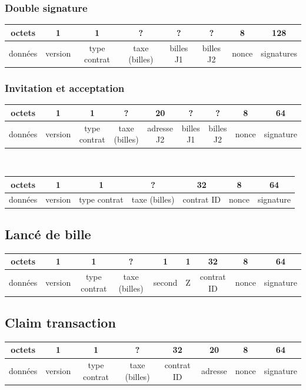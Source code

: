\documentclass{article}
\begin{document}
\subsubsection{Double signature}
\hspace*{-1cm}%
\begin{tabular}{ |c|c|c|c|c|c|c|c|} 
 \hline
 octets & 1 & 1 & ? & ? & ? & 8 & 128\\ 
 \hline
    données & version & type contrat & taxe (billes) & billes J1 & billes J2 & nonce & signatures\\ 
 \hline
\end{tabular}

\subsubsection{Invitation et acceptation}
\hspace*{-1cm}%
\begin{tabular}{ |c|c|c|c|c|c|c|c|c|} 
 \hline
 octets & 1 & 1 & ? & 20 & ? & ? & 8 & 64\\ 
 \hline
    données & version & type contrat & taxe (billes) & adresse J2 & billes J1 & billes J2 & nonce & signature\\ 
 \hline
\end{tabular}\\ \break

\hspace*{-1cm}%
\begin{tabular}{ |c|c|c|c|c|c|c|} 
 \hline
 octets & 1 & 1 & ? & 32 & 8 & 64\\ 
 \hline
    données & version & type contrat & taxe (billes) & contrat ID & nonce & signature\\ 
 \hline
\end{tabular}

\subsection{Lancé de bille}
\hspace*{-1cm}%
\begin{tabular}{ |c|c|c|c|c|c|c|c|c|} 
 \hline
 octets & 1 & 1 & ? & 1 & 1 & 32 & 8 & 64 \\ 
 \hline
    données & version & type contrat & taxe (billes) & second & Z & contrat ID & nonce & signature\\ 
 \hline
\end{tabular}

\subsection{Claim transaction}
\hspace*{-1cm}%
\begin{tabular}{ |c|c|c|c|c|c|c|c|} 
 \hline
 octets & 1 & 1 & ? & 32 & 20 & 8 & 64 \\ 
 \hline
    données & version & type contrat & taxe (billes) & contrat ID & adresse & nonce & signature\\ 
 \hline
\end{tabular}
\end{document}
